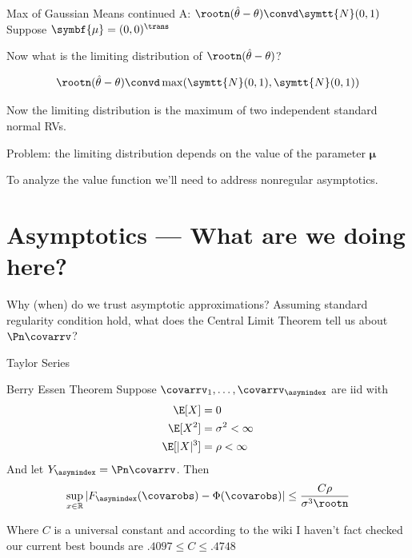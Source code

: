 \documentclass[aspectratio=169, professionalfonts]{beamer}
\begin{document}
\begin{frame}{Max of Gaussian Means continued}
	A: $\rootn (\hat{\theta} - \theta) \convd \symtt{N}(0, 1)$
	\pause
	\vfill
	Suppose $\symbf{\mu} = (0 , 0)^{\trans}$

	Now what is the limiting distribution of $ \rootn (\hat{\theta} - \theta)$?

	\vfill \pause

	$$\rootn (\hat{\theta} - \theta) \convd \max(\symtt{N}(0, 1), \symtt{N}(0, 1))$$

	Now the limiting distribution is the maximum of two independent standard
	normal RVs.

	\vfill \pause

	Problem: the limiting distribution depends on the value of the parameter
	$\symbf{\mu}$

	\vfill

	To analyze the value function we'll need to address nonregular asymptotics.
\end{frame}


\section{Asymptotics --- What are we doing here?}
\begin{frame}{Why (when) do we trust asymptotic approximations?}
	Assuming standard regularity condition hold, what does the Central Limit
	Theorem tell us about $\Pn \covarrv$?

	Taylor Series
\end{frame}

\begin{frame}{Berry Essen Theorem}
	Suppose $\covarrv_1, \ldots, \covarrv_{\asymindex}$ are iid with
	\begin{align*}
		\E[X]     & = 0                 \\
		\E[X^2]   & = \sigma^2 < \infty \\
		\E[|X|^3] & = \rho < \infty
	\end{align*}
	And let $Y_{\asymindex} = \Pn \covarrv$. Then
	\vfill
	\begin{equation}
		\sup_{x \in \mathbb{R}}|F_{\asymindex}(\covarobs) - \Phi(\covarobs)| \leq \frac{C
			\rho}{\sigma^{3} \rootn }
	\end{equation}

	Where $C$ is a universal constant and according to the wiki I haven't fact
	checked our current best bounds are $.4097 \leq C \leq .4748$
	\vfill
\end{frame}
\end{document}
